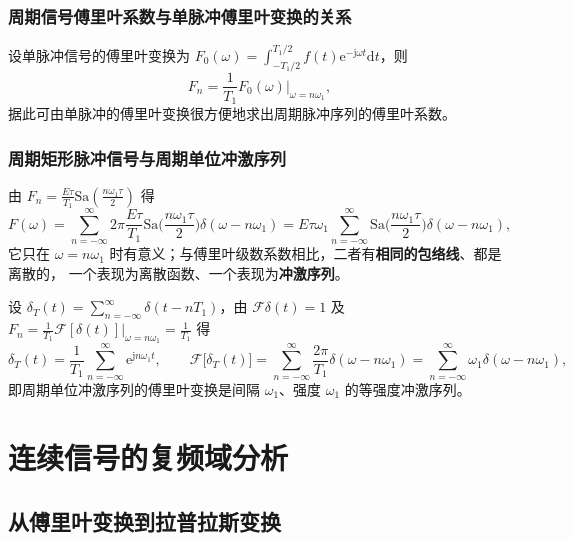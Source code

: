 \subsubsection{周期信号傅里叶系数与单脉冲傅里叶变换的关系}

设单脉冲信号的傅里叶变换为
$F_0(\omega)=\displaystyle\int_{-T_1/2}^{T_1/2}f(t)\mathrm{e}^{-\mathrm{j}\omega t}\mathrm{d}t$，则
\begin{equation}
F_n=\frac{1}{T_1}F_0(\omega)\Big|_{\omega=n\omega_1},
\end{equation}
据此可由单脉冲的傅里叶变换很方便地求出周期脉冲序列的傅里叶系数。

\subsubsection{周期矩形脉冲信号与周期单位冲激序列}

由 $F_n=\frac{E\tau}{T_1}\mathrm{Sa}(\frac{n\omega_1\tau}{2})$ 得
\begin{equation}
F(\omega)=\sum_{n=-\infty}^{\infty}2\pi\frac{E\tau}{T_1}\mathrm{Sa}\Big(\frac{n\omega_1\tau}{2}\Big)\delta(\omega-n\omega_1)
=E\tau\omega_1\sum_{n=-\infty}^{\infty}\mathrm{Sa}\Big(\frac{n\omega_1\tau}{2}\Big)\delta(\omega-n\omega_1),
\end{equation}
它只在 $\omega=n\omega_1$ 时有意义；与傅里叶级数系数相比，二者有\textbf{相同的包络线}、都是离散的，
一个表现为离散函数、一个表现为\textbf{冲激序列}。

设 $\delta_T(t)=\sum_{n=-\infty}^{\infty}\delta(t-nT_1)$，由 $\mathcal{F}\delta(t)=1$ 及
$F_n=\frac{1}{T_1}\mathcal{F}[\delta(t)]|_{\omega=n\omega_1}=\frac{1}{T_1}$ 得
\begin{equation}
\delta_T(t)=\frac{1}{T_1}\sum_{n=-\infty}^{\infty}\mathrm{e}^{\mathrm{j}n\omega_1t},\qquad
\mathcal{F}\big[\delta_T(t)\big]=\sum_{n=-\infty}^{\infty}\frac{2\pi}{T_1}\delta(\omega-n\omega_1)
=\sum_{n=-\infty}^{\infty}\omega_1\delta(\omega-n\omega_1),
\end{equation}
即周期单位冲激序列的傅里叶变换是间隔 $\omega_1$、强度 $\omega_1$ 的等强度冲激序列。

\section{连续信号的复频域分析}

\subsection{从傅里叶变换到拉普拉斯变换}

